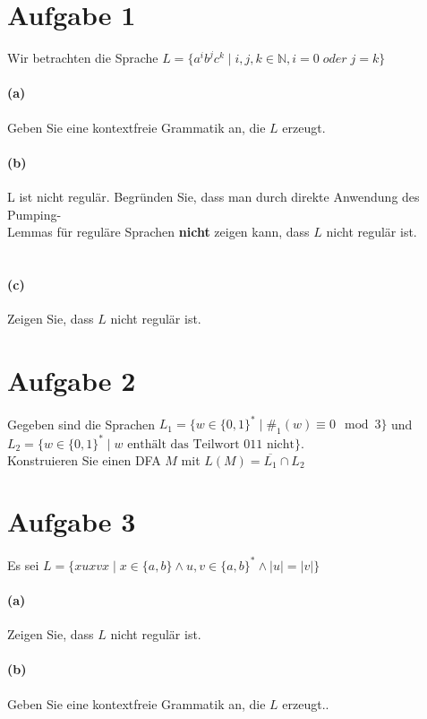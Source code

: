 \documentclass[titlepage]{article}
\renewcommand{\]}{\right]}
\renewcommand{\[}{\left[}
\renewcommand{\)}{\right)}
\renewcommand{\(}{\left(}
\renewcommand{\|}{\;|\;}
\begin{document}
\begingroup\let\clearpage\relax
	
	
	\section*{Aufgabe 1}
	Wir betrachten die Sprache $L=\{a^ib^jc^k\mid i,j,k\in\mathbb{N},i=0\;oder\;j=k\}$
		\paragraph{(a)} Geben Sie eine kontextfreie Grammatik an, die $L$ erzeugt.
		
		\paragraph{(b)} L ist nicht regulär. Begründen Sie, dass man durch direkte Anwendung des Pumping-\\Lemmas für reguläre Sprachen \textbf{nicht} zeigen kann, dass $L$ nicht regulär ist.\\\\
		
		\paragraph{(c)} Zeigen Sie, dass $L$ nicht regulär ist.
		
	\section*{Aufgabe 2}Gegeben sind die Sprachen $L_1=\{w\in\{0,1\}^*\mid\#_1(w)\equiv0\mod3\}$ und\\ $L_2=\{w\in\{0,1\}^*\mid w\text{ enthält das Teilwort 011 nicht}\}.$ \\Konstruieren Sie einen DFA $M$ mit $L(M)=\overline{L_1}\cap L_2$
	
	
	\section*{Aufgabe 3} Es sei $L=\{xuxvx\mid x\in\{a,b\}\land u,v\in\{a,b\}^*\land\mid u\mid=\mid v\mid\}$
		\paragraph{(a)} Zeigen Sie, dass $L$ nicht regulär ist.
		
		\paragraph{(b)} Geben Sie eine kontextfreie Grammatik an, die $L$ erzeugt..
		

\endgroup
\end{document}
